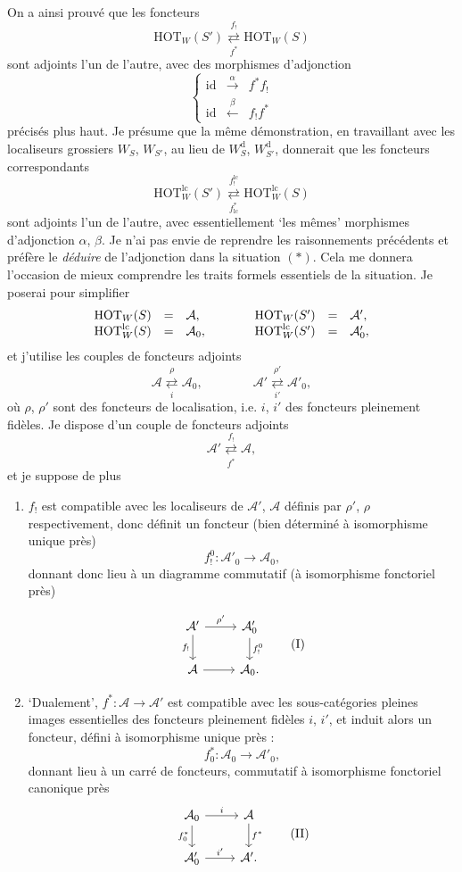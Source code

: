 \documentclass[11pt]{article}
\newcommand{\printedpage}[1]{\marginpar{\footnotesize p.~#1}}
\newcommand{\msp}[1]{\marginpar{\footnotesize [#1]}}
\newcommand{\HOT}{\mathrm{HOT}}
\newcommand{\id}{\mathrm{id}}
\newcommand{\cA}{\mathcal{A}}
\newcommand{\dd}{\mathrm{d}}
\newcommand{\lc}{\mathrm{lc}}
\newcommand{\adj}[2]{\mathrel{\underset{#2}{\overset{#1}{\rightleftarrows}}}}
\begin{document}
\printedpage{90}

\msp{page 147}
On a ainsi prouvé que les foncteurs
\[
\HOT_W(S') \adj{f_!}{f^*} \HOT_W(S)
\tag*{$(*)$}
\]
sont adjoints l'un de l'autre, avec des morphismes d'adjonction
\[
\left\{
\begin{array}{lcl}
\id & \xrightarrow{\ \alpha\ } & f^*f_! \\[1ex]
\id & \xleftarrow{\ \beta\ } & f_!f^*
\end{array}
\right.
\]
précisés plus haut. Je présume que la même démonstration, en travaillant avec les localiseurs grossiers $W_S$, $W_{S'}$, au lieu de $W^{\dd}_S$, $W^{\dd}_{S'}$, donnerait que les foncteurs correspondants
\[
\HOT^{\lc}_W(S') \adj{f_!^{\lc}}{f^*_{\lc}} \HOT^{\lc}_W(S)
\tag*{$(**)$}
\]
sont adjoints l'un de l'autre, avec essentiellement ‘les mêmes’ morphismes d'adjonction $\alpha$, $\beta$. Je n'ai pas envie de reprendre les raisonnements précédents et préfère le \textit{déduire} de l'adjonction dans la situation $(*)$. Cela me donnera l'occasion de mieux comprendre les traits formels essentiels de la situation. Je poserai pour simplifier
\msp{page 148}
\[
\begin{array}{rcl@{\qquad\qquad}rcl}
\HOT_W(S) & = & \cA, & \HOT_W(S') & = & \cA', \\
\HOT^{\lc}_W(S) & = & \cA_0, & \HOT^{\lc}_W(S') & = & \cA'_0,
\end{array}
\]
et j'utilise les couples de foncteurs adjoints
\[
\cA \adj{\rho}{i} \cA_0, \qquad\qquad \cA' \adj{\rho'}{i'} \cA'_0,
\]
où $\rho$, $\rho'$ sont des foncteurs de localisation, i.e. $i$, $i'$ des foncteurs pleinement fidèles. Je dispose d'un couple de foncteurs adjoints
\[
\cA' \adj{f_!}{f^*} \cA,
\]
et je suppose de plus

\begin{enumerate}
\item[a)] $f_!$ est compatible avec les localiseurs de $\cA'$, $\cA$ définis par $\rho'$, $\rho$ respectivement, donc définit un foncteur (bien déterminé à isomorphisme unique près)
\[
f_!^0 : \cA'_0 \longrightarrow \cA_0,
\]
donnant donc lieu à un diagramme commutatif (à isomorphisme fonctoriel près)


\printedpage{91}
\[
\begin{tikzcd}
\cA' \arrow[r, "\rho'"] \arrow[d, "f_!"'] & \cA'_0 \arrow[d, "f_!^0"] \\
\cA \arrow[r] & \cA_0.
\end{tikzcd}
\tag*{(I)}
\]


\item[b)] ‘Dualement’, $f^* : \cA \longrightarrow \cA'$ est compatible avec les sous-catégories pleines images essentielles des foncteurs pleinement fidèles $i$, $i'$, et induit
\msp{page 149}
alors un foncteur, défini à isomorphisme unique près :
\[
f_0^* : \cA_0 \longrightarrow \cA'_0,
\]
donnant lieu à un carré de foncteurs, commutatif à isomorphisme fonctoriel canonique près
\[
\begin{tikzcd}
\cA_0 \arrow[r, "i"] \arrow[d, "f_0^*"'] & \cA \arrow[d, "f^*"] \\
\cA'_0 \arrow[r, "i'"] & \cA'.
\end{tikzcd}
\tag*{(II)}
\]
\end{enumerate}
\end{document}
